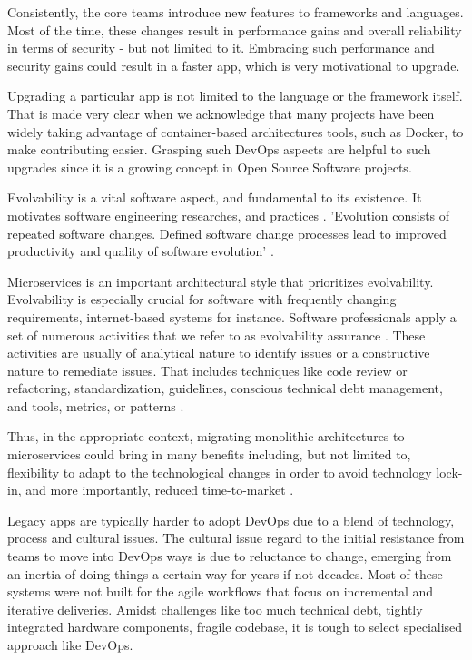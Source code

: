 Consistently, the core teams introduce new features to frameworks and
languages. Most of the time, these changes result in performance gains and
overall reliability in terms of security - but not limited to it. Embracing
such performance and security gains could result in a faster app, which is very
motivational to upgrade.

Upgrading a particular app is not limited to the language or the framework
itself. That is made very clear when we acknowledge that many projects have
been widely taking advantage of container-based architectures tools, such as
Docker, to make contributing easier. Grasping such DevOps aspects are helpful
to such upgrades since it is a growing concept in Open Source Software
projects.

Evolvability is a vital software aspect, and fundamental to its existence. It
motivates software engineering researches, and practices \cite{rajlich2018}.
'Evolution consists of repeated software changes. Defined software change
processes lead to improved productivity and quality of software evolution'
\cite{rajlich2018}. 

Microservices is an important architectural style that prioritizes evolvability.
Evolvability is especially crucial for software with frequently changing
requirements, internet-based systems for instance. Software professionals apply
a set of numerous activities that we refer to as evolvability assurance
\cite{bogner2019assuring}. These activities are usually of analytical nature to
identify issues or a constructive nature to remediate issues. That includes
techniques like code review or refactoring, standardization, guidelines,
conscious technical debt management, and tools, metrics, or patterns
\cite{bogner2019assuring}.

Thus, in the appropriate context, migrating monolithic architectures to
microservices could bring in many benefits including, but not limited to,
flexibility to adapt to the technological changes in order to avoid technology
lock-in, and more importantly, reduced time-to-market \cite{jamshid2016}.

Legacy apps are typically harder to adopt DevOps due to a blend of technology,
process and cultural issues. The cultural issue regard to the initial resistance
from teams to move into DevOps ways is due to reluctance to change, emerging
from an inertia of doing things a certain way for years if not decades. Most of
these systems were not built for the agile workflows that focus on incremental
and iterative deliveries. Amidst challenges like too much technical debt,
tightly integrated hardware components, fragile codebase, it is tough to select
specialised approach like DevOps.

